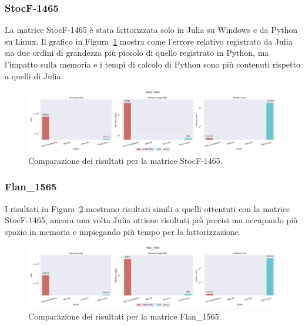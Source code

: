 \documentclass[a4paper, 12pt]{article}
\begin{document}
            \subsubsection{StocF-1465}
                La matrice StocF-1465 è stata fattorizzata solo in Julia su 
                Windows e da Python su Linux. Il grafico in 
                Figura~\ref{fig:StocF-1465} mostra come l'errore relativo
                registrato da Julia sia due ordini di grandezza più piccolo di
                quello registrato in Python, ma l'impatto sulla memoria e i 
                tempi di calcolo di Python sono più contenuti rispetto a quelli
                di Julia.
                \begin{figure}[h]
                    \includegraphics[width=\textwidth]{StocF-1465}
                    \caption{Comparazione dei risultati per la matrice StocF-1465.}
                    \label{fig:StocF-1465}
                \end{figure}
            \subsubsection{Flan\_1565}
                I risultati in Figura~\ref{fig:Flan_1565} mostrano risultati 
                simili a quelli ottentuti con la matrice StocF-1465, ancora una 
                volta Julia ottiene risultati più precisi ma occupando più 
                spazio in memoria e impiegando più tempo per la fattorizzazione.
                \begin{figure}[h]
                    \includegraphics[width=\textwidth]{Flan_1565}
                    \caption{Comparazione dei risultati per la matrice Flan\_1565.}
                    \label{fig:Flan_1565}
                \end{figure}
\end{document}
